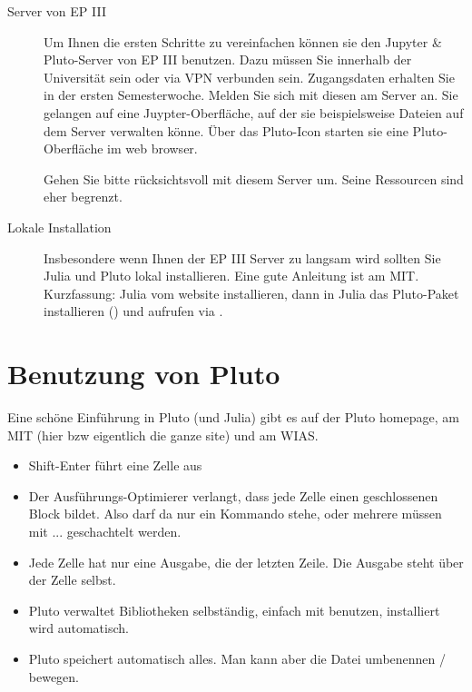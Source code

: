 \begin{description}
\item[Server von EP III] Um Ihnen die ersten Schritte zu vereinfachen können sie den Jupyter \& Pluto-Server von EP III benutzen. Dazu müssen Sie innerhalb der Universität sein oder via VPN verbunden sein. Zugangsdaten erhalten Sie in der ersten Semesterwoche. Melden Sie sich mit diesen am Server an. Sie gelangen auf eine Juypter-Oberfläche, auf der sie beispielsweise Dateien auf dem Server verwalten könne. Über das Pluto-Icon starten sie eine Pluto-Oberfläche im web browser.

Gehen Sie bitte rücksichtsvoll mit diesem Server um. Seine Ressourcen sind eher begrenzt.

\item[Lokale Installation] Insbesondere wenn Ihnen der EP III Server zu langsam wird sollten Sie Julia und Pluto lokal installieren. Eine gute Anleitung ist am MIT. Kurzfassung: Julia vom website installieren, dann in Julia das Pluto-Paket installieren () und aufrufen via . 



\end{description}


\section{Benutzung von Pluto}

Eine schöne Einführung in Pluto (und Julia) gibt es auf der Pluto homepage,
 am MIT 
(hier
bzw eigentlich die ganze site)
und am WIAS.

\begin{itemize}
\item Shift-Enter führt eine Zelle aus

\item Der Ausführungs-Optimierer verlangt, dass jede Zelle einen geschlossenen Block bildet. Also darf da nur ein Kommando stehe, oder mehrere müssen mit   ...   geschachtelt werden.

\item Jede Zelle hat nur eine Ausgabe, die der letzten Zeile. Die Ausgabe steht über der Zelle selbst.

\item Pluto verwaltet Bibliotheken selbständig, einfach mit   benutzen, installiert wird automatisch.

\item Pluto speichert automatisch alles. Man kann aber die Datei umbenennen / bewegen.



\end{itemize}




